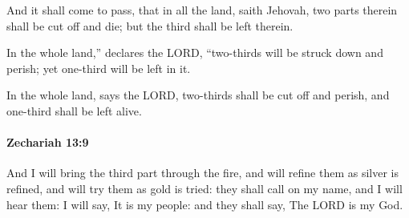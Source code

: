 			\begin{versebox}
					\item[BHS] 
					\item[LXX] 
					\item[ASV] And it shall come to pass, that in all the land, saith Jehovah, two parts therein shall be cut off and die; but the third shall be left therein.
					\item[NIV] In the whole land,” declares the LORD, “two-thirds will be struck down and perish; yet one-third will be left in it.
					\item[NRSV] In the whole land, says the LORD, two-thirds shall be cut off and perish, and one-third shall be left alive.
			\end{versebox}

		\paragraph{Zechariah 13:9} %
			\label{ZECHARIAH-13-9}

			And I will bring the third part through the fire, and will refine them as silver is refined, and will try them as gold is tried: they shall call on my name, and I will hear them: I will say, It is my people: and they shall say, The LORD is my God.


